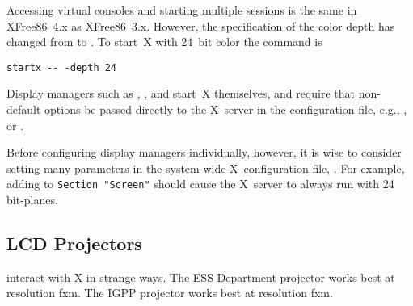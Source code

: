 \documentclass[12pt,twoside]{article}
\begin{document}
Accessing virtual consoles and starting multiple
sessions is the same in XFree86~4.x as XFree86~3.x.
However, the specification of the color depth has changed from
 to . 
To start~X with 24~bit color the command is
\begin{verbatim}
startx -- -depth 24
\end{verbatim}
\begin{sloppy}
Display managers such as , , and 
start~X themselves, and require that non-default options be passed
directly to the X~server in the configuration file, e.g.,
, or .
\end{sloppy}
Before configuring display managers individually, however, it is wise
to consider setting many parameters in the system-wide X~configuration 
file, .
For example, adding  to
\verb'Section "Screen"' should cause the X~server to always run with
24 bit-planes.

\subsection{LCD Projectors}\label{sxn:lcd}
 interact with X in strange ways. 
The ESS Department projector works best at resolution fxm.
The IGPP projector works best at resolution fxm.
\end{document}
